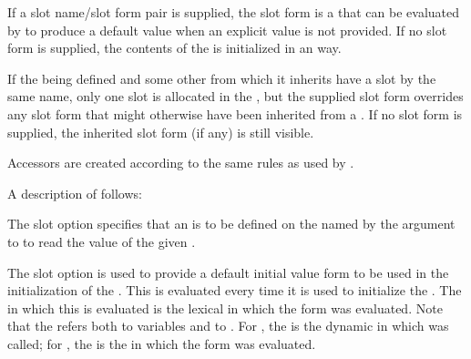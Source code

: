   If a slot name/slot form pair is supplied,
the slot form is a  that 
can be evaluated by  to
  produce a default value when an explicit value is not provided.  If no 
slot form
is supplied, the contents of the  
is initialized in an 
   way.  

  If the  being defined and some other 
 from which it inherits
  have a slot by the same name, only one slot is allocated in the
  , 
but the supplied slot form overrides any slot form
  that might otherwise have been inherited from a .  If no 
slot form is supplied, the inherited slot form (if any) is still visible.


Accessors are created according to the same rules as used by 
.

A description of  follows:


\beginlist

   

The  slot option specifies that an  is
to be defined on the  named by the argument
to  to read the value of the given .
 

\itemitem{\bull} The  slot option is used to provide a default
initial value form to be used in the initialization of the .  This
 is evaluated every time it is used to initialize the 
.  The
in which this  is evaluated is the lexical
 in which the  
form was evaluated.
Note that the  refers both to variables and to
.  
For , the  is the dynamic
in which  was called; for 
, the  
is the  in which the
 form was evaluated.  
 
